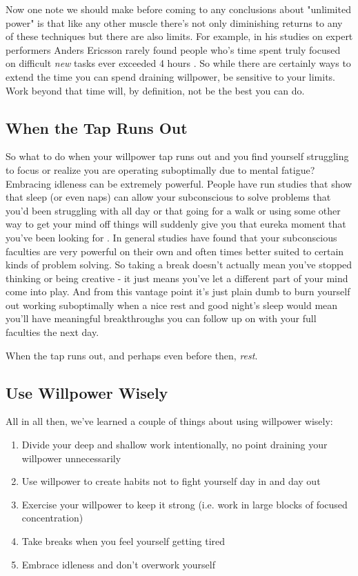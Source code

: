 \documentclass[11pt]{book}
\begin{document}
Now one note we should make before coming to any conclusions about "unlimited power" is that like any other muscle there's not only diminishing returns to any of these techniques but there are also limits. For example, in his studies on expert performers Anders Ericsson rarely found people who's time spent truly focused on difficult \textit{new} tasks ever exceeded 4 hours \cite{newport}. So while there are certainly ways to extend the time you can spend draining willpower, be sensitive to your limits. Work beyond that time will, by definition, not be the best you can do.

\subsection{When the Tap Runs Out}
So what to do when your willpower tap runs out and you find yourself struggling to focus or realize you are operating suboptimally due to mental fatigue? Embracing idleness can be extremely powerful. People have run studies that show that sleep (or even naps) can allow your subconscious to solve problems that you'd been struggling with all day \cite{kaufman} or that going for a walk or using some other way to get your mind off things will suddenly give you that eureka moment that you've been looking for \cite{newport}. In general studies have found that your subconscious faculties are very powerful on their own and often times better suited to certain kinds of problem solving. So taking a break doesn't actually mean you've stopped thinking or being creative - it just means you've let a different part of your mind come into play. And from this vantage point it's just plain dumb to burn yourself out working suboptimally when a nice rest and good night's sleep would mean you'll have meaningful breakthroughs you can follow up on with your full faculties the next day.
\newline

When the tap runs out, and perhaps even before then, \textit{rest}.

\subsection{Use Willpower Wisely}
All in all then, we've learned a couple of things about using willpower wisely:
\begin{enumerate}
\item Divide your deep and shallow work intentionally, no point draining your willpower unnecessarily
\item Use willpower to create habits not to fight yourself day in and day out
\item Exercise your willpower to keep it strong (i.e. work in large blocks of focused concentration)
\item Take breaks when you feel yourself getting tired 
\item Embrace idleness and don't overwork yourself
\end{enumerate}
\end{document}
